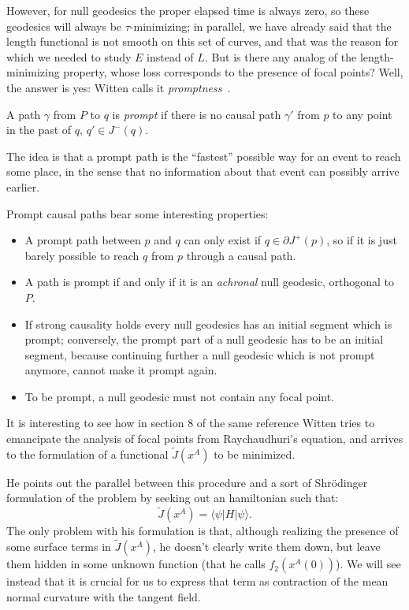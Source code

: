 However, for null geodesics the proper elapsed time is always zero, so these geodesics will always be \(\tau\)-minimizing; in parallel, we have already said that the length functional is not smooth on this set of curves, and that was the reason for which we needed to study \(E\) instead of \(L\). But is there any analog of the length-minimizing property, whose loss corresponds to the presence of focal points? Well, the answer is yes: Witten calls it \emph{promptness}~\cite{witten2020light}.

\begin{definition}
	A path \(\gamma\) from \(P\) to \(q\) is \emph{prompt} if there is no causal path \(\gamma'\) from \(p\) to any point in the past of \(q\), \(q'\in J^-(q)\).
\end{definition}

The idea is that a prompt path is the ``fastest'' possible way for an event to reach some place, in the sense that no information about that event can possibly arrive earlier.

Prompt causal paths bear some interesting properties:
\begin{itemize}
	\item[\ding{99}] A prompt path between \(p\) and \(q\) can only exist if \(q\in\partial J^+(p)\), so if it is just barely possible to reach \(q\) from \(p\) through a causal path.
	\item[\ding{99}] A path is prompt if and only if it is an \emph{achronal} null geodesic, orthogonal to \(P\).
	\item[\ding{99}] If strong causality holds every null geodesics has an initial segment which is prompt; conversely, the prompt part of a null geodesic has to be an initial segment, because continuing further a null geodesic which is not prompt anymore, cannot make it prompt again.
	\item[\ding{99}] To be prompt, a null geodesic must not contain any focal point.
\end{itemize}

It is interesting to see how in section \(8\) of the same reference Witten tries to emancipate the analysis of focal points from Raychaudhuri's equation, and arrives to the formulation of a functional \(\tilde{J}(x^A)\) to be minimized.

He points out the parallel between this procedure and a sort of Shr\"odinger formulation of the problem by seeking out an hamiltonian such that:
\[
	\tilde{J}(x^A) = \langle \psi \vert H \vert \psi \rangle.	
\]
The only problem with his formulation is that, although realizing the presence of some surface terms in \(\tilde{J}(x^A)\), he doesn't clearly write them down, but leave them hidden in some unknown function (that he calls \(f_2(x^A(0))\)). We will see instead that it is crucial for us to express that term as contraction of the mean normal curvature with the tangent field.
